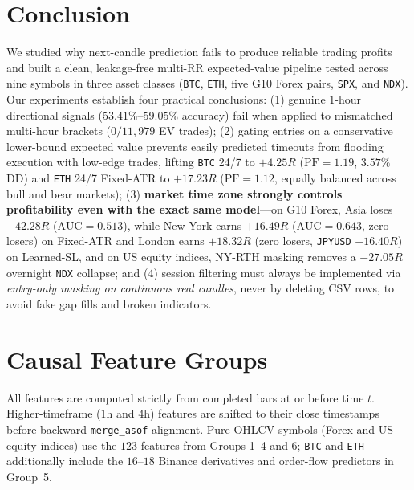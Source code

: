 \documentclass{article}
\newcommand{\RR}{\mathrm{RR}}
\newcommand{\PF}{\mathrm{PF}}
\begin{document}
\section{Conclusion}
\label{sec:conclusion}

We studied why next-candle prediction fails to produce reliable trading profits and built a clean, leakage-free multi-$\RR$ expected-value pipeline tested across nine symbols in three asset classes (\texttt{BTC}, \texttt{ETH}, five G10 Forex pairs, \texttt{SPX}, and \texttt{NDX}). Our experiments establish four practical conclusions: (1) genuine $1$-hour directional signals ($53.41\%$--$59.05\%$ accuracy) fail when applied to mismatched multi-hour brackets ($0 / 11{,}979$ EV trades); (2) gating entries on a conservative lower-bound expected value prevents easily predicted timeouts from flooding execution with low-edge trades, lifting \texttt{BTC} 24/7 to $+4.25R$ ($\PF=1.19$, $3.57\%$ DD) and \texttt{ETH} 24/7 Fixed-ATR to $+17.23R$ ($\PF=1.12$, equally balanced across bull and bear markets); (3) \textbf{market time zone strongly controls profitability even with the exact same model}—on G10 Forex, Asia loses $-42.28R$ ($\mathrm{AUC}=0.513$), while New York earns $+16.49R$ ($\mathrm{AUC}=0.643$, zero losers) on Fixed-ATR and London earns $+18.32R$ (zero losers, \texttt{JPYUSD} $+16.40R$) on Learned-SL, and on US equity indices, NY-RTH masking removes a $-27.05R$ overnight \texttt{NDX} collapse; and (4) session filtering must always be implemented via \emph{entry-only masking on continuous real candles}, never by deleting CSV rows, to avoid fake gap fills and broken indicators.




\clearpage
\appendix

\section{Causal Feature Groups}
\label{app:features}

All features are computed strictly from completed bars at or before time $t$. Higher-timeframe ($1\text{h}$ and $4\text{h}$) features are shifted to their close timestamps before backward \texttt{merge\_asof} alignment. Pure-OHLCV symbols (Forex and US equity indices) use the $123$ features from Groups 1--4 and 6; \texttt{BTC} and \texttt{ETH} additionally include the $16$--$18$ Binance derivatives and order-flow predictors in Group~5.
\end{document}
